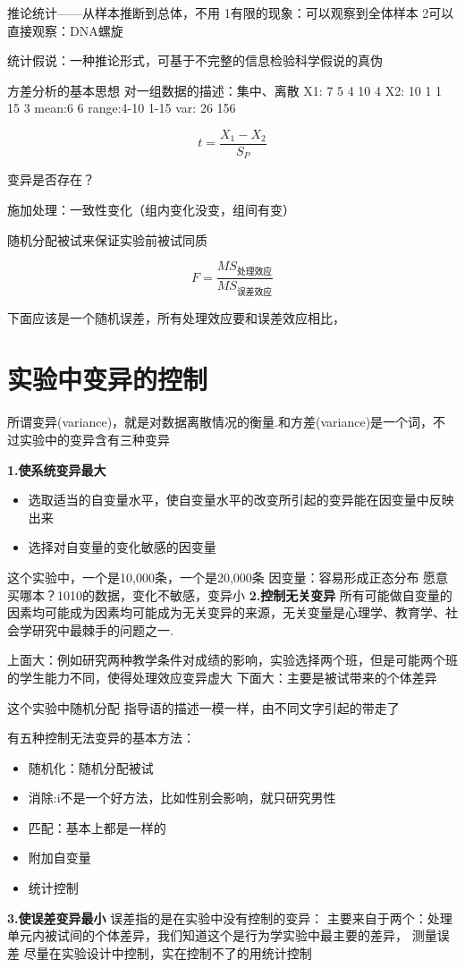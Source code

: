 推论统计——从样本推断到总体，不用
1有限的现象：可以观察到全体样本
2可以直接观察：DNA螺旋

统计假说：一种推论形式，可基于不完整的信息检验科学假说的真伪

方差分析的基本思想
对一组数据的描述：集中、离散
X1: 7 5 4 10 4
X2: 10 1 1 15 3
mean:6 6
range:4-10 1-15
var: 26 156

$$
	t=\frac{X_1-X_2}{S_P}
$$

变异是否存在？

施加处理：一致性变化（组内变化没变，组间有变）

随机分配被试来保证实验前被试同质

$$
	F=\frac{MS_{\text{处理效应}}}{MS_{\text{误差效应}}}
$$

下面应该是一个随机误差，所有处理效应要和误差效应相比，



\section{实验中变异的控制}
所谓变异(variance)，就是对数据离散情况的衡量.和方差(variance)是一个词，不过实验中的变异含有三种变异

\textbf{1.使系统变异最大}
	\begin{itemize}
		\item 选取适当的自变量水平，使自变量水平的改变所引起的变异能在因变量中反映出来
		\item 选择对自变量的变化敏感的因变量
	\end{itemize}

这个实验中，一个是10,000条，一个是20,000条
因变量：容易形成正态分布
愿意买哪本？1010的数据，变化不敏感，变异小
\textbf{2.控制无关变异}
所有可能做自变量的因素均可能成为因素均可能成为无关变异的来源，无关变量是心理学、教育学、社会学研究中最棘手的问题之一.

上面大：例如研究两种教学条件对成绩的影响，实验选择两个班，但是可能两个班的学生能力不同，使得处理效应变异虚大
下面大：主要是被试带来的个体差异

这个实验中随机分配
指导语的描述一模一样，由不同文字引起的带走了

有五种控制无法变异的基本方法：

\begin{itemize}
	\item 随机化：随机分配被试
	\item 消除:i不是一个好方法，比如性别会影响，就只研究男性
	\item 匹配：基本上都是一样的
	\item 附加自变量
	\item 统计控制
\end{itemize}
\textbf{3.使误差变异最小}
误差指的是在实验中没有控制的变异：
主要来自于两个：处理单元内被试间的个体差异，我们知道这个是行为学实验中最主要的差异，
测量误差
尽量在实验设计中控制，实在控制不了的用统计控制 

